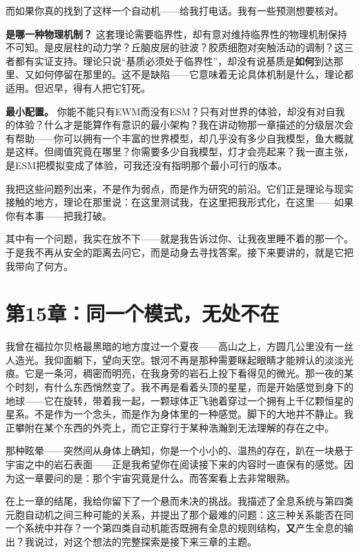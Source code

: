 \documentclass[11pt, twoside, openright]{book}
\begin{document}
而如果你真的找到了这样一个自动机------给我打电话。我有一些预测想要核对。

\textbf{是哪一种物理机制？} 这套理论需要临界性，却有意对维持临界性的物理机制保持不可知。是皮层柱的动力学？丘脑皮层的驻波？胶质细胞对突触活动的调制？这三者都有实证支持。理论只说“基质必须处于临界性”，却没有说基质是\textbf{如何}到达那里、又如何停留在那里的。这不是缺陷------它意味着无论具体机制是什么，理论都适用。但迟早，得有人把它钉死。

\textbf{最小配置。} 你能不能只有EWM而没有ESM？只有对世界的体验，却没有对自我的体验？什么才是能算作有意识的最小架构？我在讲动物那一章描述的分级层次会有帮助------你可以拥有一个丰富的世界模型，却几乎没有多少自我模型，鱼大概就是这样。但阈值究竟在哪里？你需要多少自我模型，灯才会亮起来？我一直主张，是ESM把模拟变成了体验，可我还没有指明那个最小可行的版本。

我把这些问题列出来，不是作为弱点，而是作为研究的前沿。它们正是理论与现实接触的地方，理论在那里说：在这里测试我，在这里把我形式化，在这里------如果你有本事------把我打破。

其中有一个问题，我实在放不下------就是我告诉过你、让我夜里睡不着的那一个。于是我不再从安全的距离去问它，而是动身去寻找答案。接下来要讲的，就是它把我带向了何方。


\chapter*{第15章：同一个模式，无处不在}

我曾在福拉尔贝格最黑暗的地方度过一个夏夜------高山之上，方圆几公里没有一丝人造光。我仰面躺下，望向天空。银河不再是那种需要眯起眼睛才能辨认的淡淡光痕。它是一条河，稠密而明亮，在我身旁的岩石上投下看得见的微光。那一夜的某个时刻，有什么东西悄然变了。我不再是看着头顶的星星，而是开始感觉到身下的地球------它在旋转，带着我一起，一颗球体正飞驰着穿过一个拥有上千亿颗恒星的星系。不是作为一个念头，而是作为身体里的一种感觉。脚下的大地并不静止。我正攀附在某个东西的外壳上，而它正穿行于某种浩瀚到无法理解的存在之中。

那种眩晕------突然间从身体上确知，你是一个小小的、温热的存在，趴在一块悬于宇宙之中的岩石表面------正是我希望你在阅读接下来的内容时一直保有的感觉。因为这一章要问的是：那个宇宙究竟是什么。而答案看上去非常眼熟。


在上一章的结尾，我给你留下了一个悬而未决的挑战。我描述了全息系统与第四类元胞自动机之间三种可能的关系，并提出了那个最难的问题：这三种关系能否在同一个系统中并存？一个第四类自动机能否既拥有全息的规则结构，\textbf{又}产生全息的输出？我说过，对这个想法的完整探索是接下来三章的主题。
\end{document}

